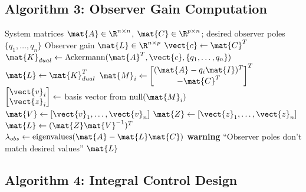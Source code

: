 \subsection{Algorithm 3: Observer Gain Computation}

\begin{algorithm}[H]
\caption{Observer Gain via Dual Pole Placement}
\label{alg:observer_gain}
\begin{algorithmic}[1]
\REQUIRE System matrices $\mat{A} \in \R^{n \times n}$, $\mat{C} \in \R^{p \times n}$; desired observer poles $\{q_1, \ldots, q_n\}$
\ENSURE Observer gain $\mat{L} \in \R^{n \times p}$
\STATE
{}
    \STATE $\vect{c} \gets \mat{C}^T$ 
    \STATE $\mat{K}_{dual} \gets \text{Ackermann}(\mat{A}^T, \vect{c}, \{q_1, \ldots, q_n\})$
    \STATE $\mat{L} \gets \mat{K}_{dual}^T$
\ELSE
    \STATE
        \STATE $\mat{M}_i \gets \begin{bmatrix} (\mat{A} - q_i\mat{I})^T \\ -\mat{C}^T \end{bmatrix}^T$
        \STATE $\begin{bmatrix} \vect{v}_i \\ \vect{z}_i \end{bmatrix} \gets$ basis vector from $\text{null}(\mat{M}_i)$
    \ENDFOR
    \STATE $\mat{V} \gets [\vect{v}_1, \ldots, \vect{v}_n]$
    \STATE $\mat{Z} \gets [\vect{z}_1, \ldots, \vect{z}_n]$
    \STATE $\mat{L} \gets (\mat{Z}\mat{V}^{-1})^T$
\ENDIF
\STATE
{}
\STATE $\lambda_{obs} \gets \text{eigenvalues}(\mat{A} - \mat{L}\mat{C})$
    \STATE \textbf{warning} ``Observer poles don't match desired values''
\ENDIF
\STATE
\RETURN $\mat{L}$
\end{algorithmic}
\end{algorithm}

\subsection{Algorithm 4: Integral Control Design}

